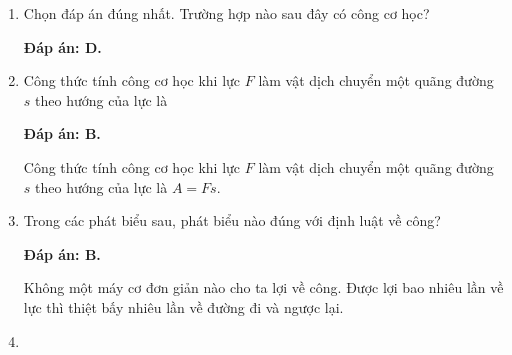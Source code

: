 \setcounter{section}{0}

\begin{enumerate}[label=\bfseries Câu \arabic*:]
	\item {}
	
	
	{
		Chọn đáp án đúng nhất. Trường hợp nào sau đây có công cơ học?
	}
	
	\hideall
	{	
			\textbf{Đáp án: D.}
	}
		\item {}
	
	
	{
		Công thức tính công cơ học khi lực $F$ làm vật dịch chuyển một quãng đường $s$ theo hướng của lực là
	}
	
	\hideall
	{	
		\textbf{Đáp án: B.}
		
		Công thức tính công cơ học khi lực $F$ làm vật dịch chuyển một quãng đường $s$ theo hướng của lực là $A=Fs$.
	}
		\item {}
	
	
	{
		Trong các phát biểu sau, phát biểu nào đúng với định luật về công?
	}
	
	\hideall
	{	
		\textbf{Đáp án: B.}
		
		Không một máy cơ đơn giản nào cho ta lợi về công. Được lợi bao nhiêu lần về lực thì thiệt bấy nhiêu lần về đường đi và ngược lại.
	}
		\item {}
	

\end{enumerate}
